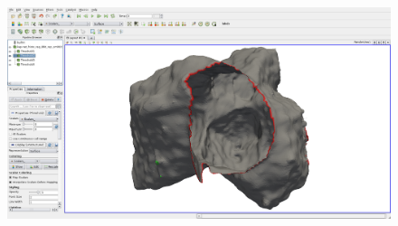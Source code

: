 \documentclass{InsightArticle}
\begin{document}
\begin{figure}
\center
\includegraphics[width=\textwidth]{images/vtkDiscreteMarchingCubes_extension_06}
\label{fig:dmcOt21}
\end{figure}



%
%

\renewcommand{\UrlBreaks}{\do\-\do\_}%
%

\end{document}

